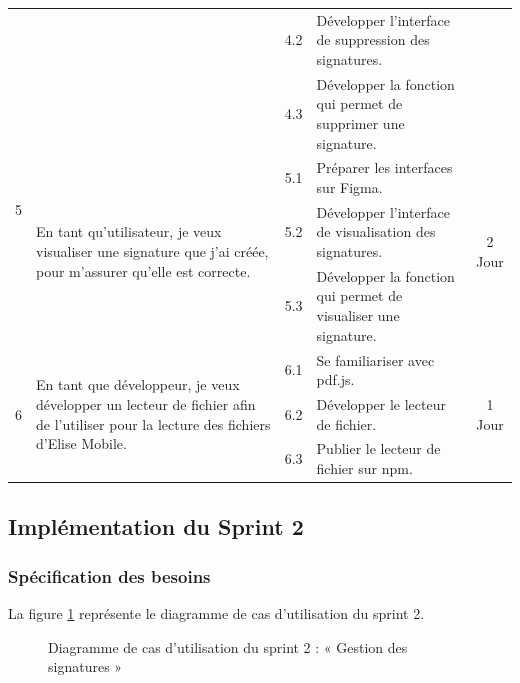 \begin{adjustwidth}{-1cm}{}
\begin{longtable}{|c|p{6cm}|c|p{6cm}|c|}
      \cline{3-4}
      & & 4.2 & Développer l'interface de suppression des signatures. & \\
      \cline{3-4}
      & & 4.3 & Développer la fonction qui permet de supprimer une signature. & \\
      \cline{1-5}
      \multirow{2}{*}{5} & \multirow{3}{6cm}{En tant qu'utilisateur, je veux visualiser une signature que j'ai créée, pour m'assurer qu'elle est correcte.} & 5.1 & Préparer les interfaces sur Figma. & \multirow{3}{*}{2 Jour} \\
      \cline{3-4}
      & & 5.2 & Développer l'interface de visualisation des signatures. & \\
      \cline{3-4}
      & & 5.3 & Développer la fonction qui permet de visualiser une signature. & \\
      \cline{1-5}
      \multirow{3}{*}{6} & \multirow{3}{6cm}{En tant que développeur, je veux développer un lecteur de fichier afin de l'utiliser pour la lecture des fichiers d'Elise Mobile.} & 6.1 & Se familiariser avec pdf.js. & \multirow{3}{*}{1 Jour} \\
      \cline{3-4}
      & & 6.2 & Développer le lecteur de fichier. & \\
      \cline{3-4}
      & & 6.3 & Publier le lecteur de fichier sur npm. & \\
  \hline

\end{longtable}
\end{adjustwidth}

\subsection{Implémentation du Sprint 2}

\subsubsection{Spécification des besoins}
La figure \ref{fig:UseCaseDiagram} représente le diagramme de cas d'utilisation du sprint 2.


\begin{figure}[H]
  \centering
  \caption{Diagramme de cas d'utilisation du sprint 2 : « Gestion des signatures »}
  \label{fig:UseCaseDiagram}
\end{figure}

